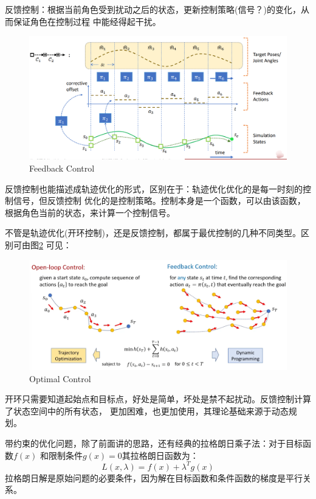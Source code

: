 \documentclass[lang=cn,newtx,10pt,scheme=chinese]{elegantbook}
\begin{document}
反馈控制：根据当前角色受到扰动之后的状态，更新控制策略(信号？)的变化，从而保证角色在控制过程
中能经得起干扰。
\begin{figure}[htbp]
  \centering
  \includegraphics[totalheight=1.6in]{"./image/Feedback-Control.png"}
  \caption{Feedback Control} \label{fig:Feedback-Controll}
\end{figure}
反馈控制也能描述成轨迹优化的形式，区别在于：轨迹优化优化的是每一时刻的控制信号，但反馈控制
优化的是控制策略。控制本身是一个函数，可以由该函数，根据角色当前的状态，来计算一个控制信号。

不管是轨迹优化(开环控制)，还是反馈控制，都属于最优控制的几种不同类型。区别可由图\ref{fig:OptimalControl}
可见：
\begin{figure}[htbp]
  \centering
  \includegraphics[totalheight=1.6in]{"./image/OptimalControl.png"}
  \caption{Optimal Control} \label{fig:OptimalControl}
\end{figure}
开环只需要知道起始点和目标点，好处是简单，坏处是禁不起扰动。反馈控制计算了状态空间中的所有状态，
更加困难，也更加使用，其理论基础来源于动态规划。

带约束的优化问题，除了前面讲的思路，还有经典的拉格朗日乘子法：对于目标函数$f(x)$
和限制条件$g(x)=0$其拉格朗日函数为：
\begin{equation}
  L(x, \lambda)=f(x)+\lambda^T g(x)
\end{equation}
拉格朗日解是原始问题的必要条件，因为解在目标函数和条件函数的梯度是平行关系。
\end{document}

